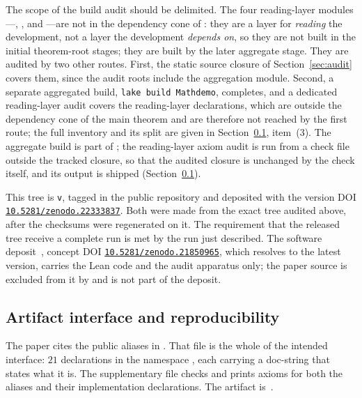 \documentclass[11pt]{article}
\theoremstyle{definition}
\theoremstyle{remark}
\newcommand{\doi}[1]{\href{https://doi.org/#1}{\texttt{#1}}}
\begin{document}
The scope of the build audit should be delimited.  The four reading-layer modules---, ,  and ---are not in the dependency cone of : they are a layer for \emph{reading} the development, not a layer the development \emph{depends on}, so they are not built in the initial theorem-root stages; they are built by the later aggregate stage.  They are audited by two other routes.  First, the static source closure of Section~\ref{sec:audit} covers them, since the audit roots include the aggregation module.  Second, a separate aggregated build, \texttt{lake build Mathdemo}, completes, and a dedicated reading-layer audit covers the reading-layer declarations, which are outside the dependency cone of the main theorem and are therefore not reached by the first route; the full inventory and its split are given in Section~\ref{sec:reproducibility}, item~(3).  The aggregate build is part of ; the reading-layer axiom audit is run from a check file outside the tracked closure, so that the audited closure is unchanged by the check itself, and its output is shipped (Section~\ref{sec:reproducibility}).

This tree is \texttt{v\CFBDCTVersion}, tagged in the public repository and deposited with the version DOI \doi{10.5281/zenodo.22333837}.  Both were made from the exact tree audited above, after the checksums were regenerated on it.  The requirement that the released tree receive a complete  run is met by the run just described.  The software deposit~\cite{artifact}, concept DOI \doi{10.5281/zenodo.21850965}, which resolves to the latest version, carries the Lean code and the audit apparatus only; the paper source is excluded from it by  and is not part of the deposit.

\subsection{Artifact interface and reproducibility}
\label{sec:reproducibility}

The paper cites the public aliases in .  That file is the whole of the intended interface: $21$ declarations in the namespace , each carrying a doc-string that states what it is.  The supplementary file  checks and prints axioms for both the aliases and their implementation declarations.  The artifact is~\cite{artifact}.
\end{document}
